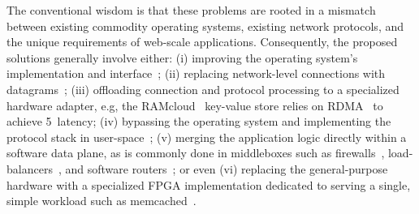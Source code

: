 
The conventional wisdom is that these problems are rooted in a
mismatch between existing commodity operating systems, existing
network protocols, and the unique requirements of web-scale
applications.  Consequently, the proposed solutions generally involve
either: 
(i) improving the operating system's implementation and
interface~\cite{DBLP:conf/eurosys/PesterevSZM12,han2012megapipe}; 
(ii) replacing network-level connections with
datagrams~\cite{nishtala2013scaling}; 
(iii) offloading connection and protocol processing to a specialized hardware adapter, e.g, the
RAMcloud~\cite{DBLP:conf/sosp/OngaroRSOR11} key-value store relies on
RDMA~\cite{rdma-user-manual} to achieve 5~\microsecond latency; (iv)
bypassing the operating system and implementing the protocol stack in
user-space~\cite{jeong2014mtcp}; (v) merging the application logic
directly within a software data plane, as is commonly done in
middleboxes such as firewalls~\cite{missing},
load-balancers~\cite{missing}, and software
routers~\cite{DBLP:journals/tocs/KohlerMCJK00,DBLP:conf/sosp/DobrescuEACFIKMR09};
or even (vi) replacing the general-purpose hardware with a specialized
FPGA implementation dedicated to serving a single, simple workload
such as memcached~\cite{DBLP:conf/fpga/ChalamalasettiLWARM13}.

